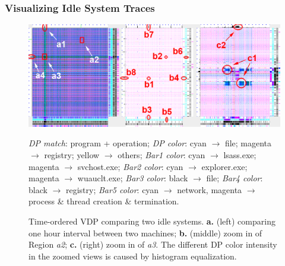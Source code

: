 \subsubsection{Visualizing Idle System Traces}
\label{sec:idle}

\begin{figure}[htb]
\includegraphics[width=1.0\textwidth]{lviz/idle-dp.png}
\caption{Time-ordered VDP comparing two idle systems.
{\bf a.} (left) comparing one hour interval between two machines;
{\bf b.} (middle) zoom in of Region {\em a2};
{\bf c.} (right) zoom in of {\em a3}.
The different DP color intensity in the zoomed views is caused by
histogram equalization.
}
\label{fig:idle-dp}
{\it DP match}: program + operation;
{\it DP color}: cyan $\rightarrow$ file; magenta $\rightarrow$ registry; yellow $\rightarrow$ others;
{\it Bar1 color}: cyan $\rightarrow$ lsass.exe; magenta $\rightarrow$ svchost.exe;
{\it Bar2 color}: cyan $\rightarrow$ explorer.exe; magenta $\rightarrow$ wuauclt.exe;
{\it Bar3 color}: black $\rightarrow$ file;
{\it Bar4 color}: black $\rightarrow$ registry;
{\it Bar5 color}: cyan $\rightarrow$ network, magenta $\rightarrow$ process \& thread creation \& termination.
\end{figure}


